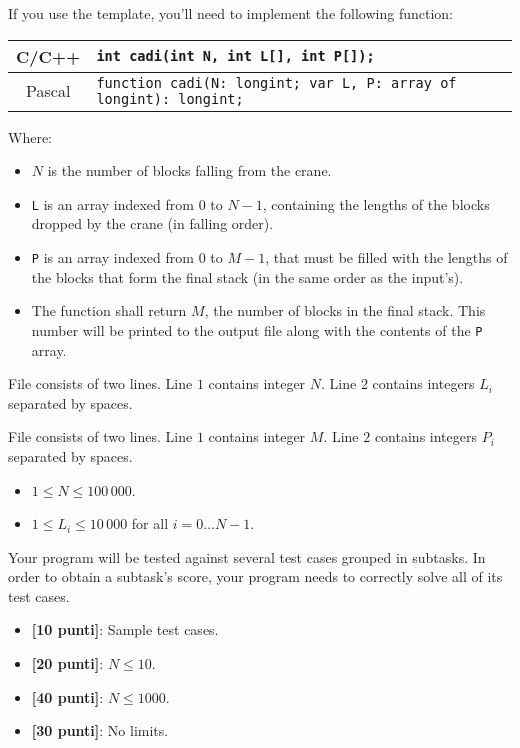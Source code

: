 If you use the template, you'll need to implement the following function:
\begin{center}\begin{tabularx}{\textwidth}{|c|X|}
\hline
C/C++  & \verb|int cadi(int N, int L[], int P[]);|\\
\hline
Pascal & \verb|function cadi(N: longint; var L, P: array of longint): longint;|\\
\hline
\end{tabularx}\end{center}
Where:
\begin{itemize}[nolistsep]
  \item $N$ is the number of blocks falling from the crane.
  \item \texttt{L} is an array indexed from $0$ to $N-1$, containing the lengths of the blocks dropped by the crane (in falling order).
  \item \texttt{P} is an array indexed from $0$ to $M-1$, that must be filled with the lengths of the blocks that form the final stack (in the same order as the input's).
  \item The function shall return $M$, the number of blocks in the final stack. This number will be printed to the output file along with the contents of the \texttt{P} array.
\end{itemize}

\InputFile
File  consists of two lines. Line $1$ contains integer $N$. Line $2$ contains integers $L_i$ separated by spaces.

\OutputFile
File \outputfile{} consists of two lines. Line $1$ contains integer $M$. Line $2$ contains integers $P_i$ separated by spaces.

\Constraints
\begin{itemize}[nolistsep, itemsep=2mm]
	\item $1 \le N \le 100\,000$.
	\item $1 \le L_i \le 10\,000$ for all $i=0\ldots N-1$.
\end{itemize}

\Scoring
Your program will be tested against several test cases grouped in subtasks.
In order to obtain a subtask's score, your program needs to correctly solve all of its test cases.

\begin{itemize}[nolistsep,itemsep=2mm]
  \item \textbf{ [10 punti]}: Sample test cases.
  \item \textbf{ [20 punti]}: $N \leq 10$.
  \item \textbf{ [40 punti]}: $N \leq 1000$.
  \item \textbf{ [30 punti]}: No limits.
\end{itemize}

